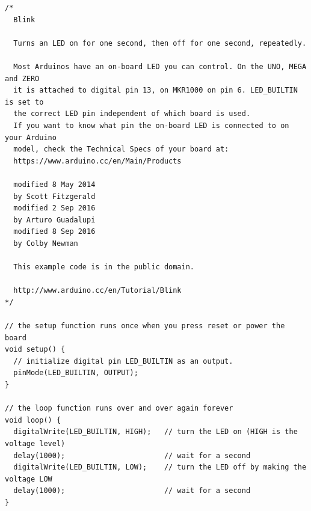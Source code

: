 \documentclass{article}
\begin{document}
\begin{lstlisting}[style=CStyle,label=orientacaoevento1,caption=Aplicação orientada a evento]
/*
  Blink

  Turns an LED on for one second, then off for one second, repeatedly.

  Most Arduinos have an on-board LED you can control. On the UNO, MEGA and ZERO
  it is attached to digital pin 13, on MKR1000 on pin 6. LED_BUILTIN is set to
  the correct LED pin independent of which board is used.
  If you want to know what pin the on-board LED is connected to on your Arduino
  model, check the Technical Specs of your board at:
  https://www.arduino.cc/en/Main/Products

  modified 8 May 2014
  by Scott Fitzgerald
  modified 2 Sep 2016
  by Arturo Guadalupi
  modified 8 Sep 2016
  by Colby Newman

  This example code is in the public domain.

  http://www.arduino.cc/en/Tutorial/Blink
*/

// the setup function runs once when you press reset or power the board
void setup() {
  // initialize digital pin LED_BUILTIN as an output.
  pinMode(LED_BUILTIN, OUTPUT);
}

// the loop function runs over and over again forever
void loop() {
  digitalWrite(LED_BUILTIN, HIGH);   // turn the LED on (HIGH is the voltage level)
  delay(1000);                       // wait for a second
  digitalWrite(LED_BUILTIN, LOW);    // turn the LED off by making the voltage LOW
  delay(1000);                       // wait for a second
}
\end{lstlisting}
\end{document}
